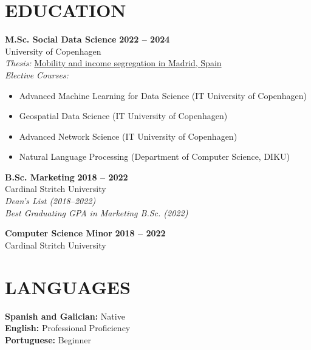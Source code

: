 \documentclass{resume}
\begin{document}
\section{EDUCATION} 
\begin{content}
    {\bf M.Sc. Social Data Science} \hfill {\bf 2022 -- 2024} \\
    University of Copenhagen \\
    {\em Thesis:} {\href{https://carobs9.github.io/segregation-mobility/}{Mobility and income segregation in Madrid, Spain}} \\
    {\em Elective Courses:}
    \begin{itemize}[noitemsep, topsep=0pt, leftmargin=*]
        \item Advanced Machine Learning for Data Science (IT University of Copenhagen)
        \item Geospatial Data Science (IT University of Copenhagen)
        \item Advanced Network Science (IT University of Copenhagen)
        \item Natural Language Processing (Department of Computer Science, DIKU)
    \end{itemize}

    \medskip

    {\bf B.Sc. Marketing} \hfill {\bf 2018 -- 2022} \\
    Cardinal Stritch University \\
    {\em Dean's List (2018--2022)} \\
    {\em Best Graduating GPA in Marketing B.Sc. (2022)}

    {\bf Computer Science Minor} \hfill {\bf 2018 -- 2022} \\
    Cardinal Stritch University \\
\sectionlineskip
\end{content}

\section{LANGUAGES} 
\begin{content}
    {\bf Spanish and Galician:} Native \\
    {\bf English:} Professional Proficiency  \\
    {\bf Portuguese:} Beginner \\
\end{content}

\end{document}
